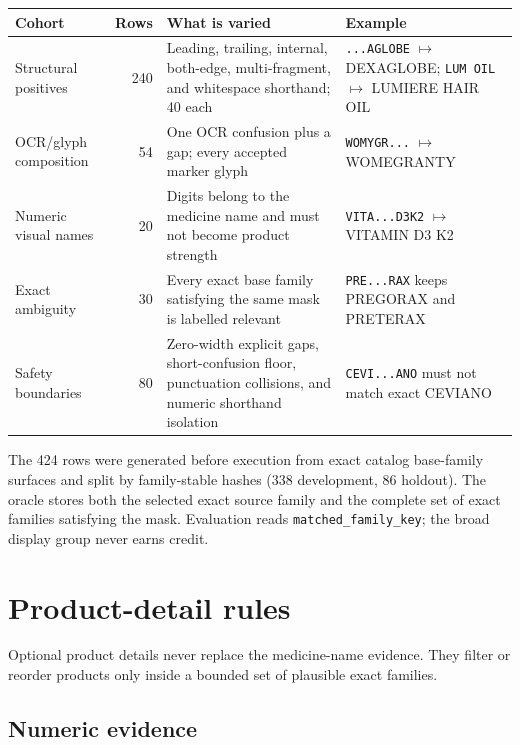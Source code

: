 \documentclass[10pt,a4paper]{article}
\newcommand{\observed}[1]{\texttt{#1}}
\begin{document}
\begin{tabularx}{\textwidth}{@{}L{39mm}r Y L{42mm}@{}}
\toprule
Cohort & Rows & What is varied & Example \\
\midrule
Structural positives & 240 & Leading, trailing, internal, both-edge, multi-fragment, and whitespace shorthand; 40 each & \observed{...AGLOBE} $\mapsto$ DEXAGLOBE; \observed{LUM OIL} $\mapsto$ LUMIERE HAIR OIL \\
OCR/glyph composition & 54 & One OCR confusion plus a gap; every accepted marker glyph & \observed{WOMYGR...} $\mapsto$ WOMEGRANTY \\
Numeric visual names & 20 & Digits belong to the medicine name and must not become product strength & \observed{VITA...D3K2} $\mapsto$ VITAMIN D3 K2 \\
Exact ambiguity & 30 & Every exact base family satisfying the same mask is labelled relevant & \observed{PRE...RAX} keeps PREGORAX and PRETERAX \\
Safety boundaries & 80 & Zero-width explicit gaps, short-confusion floor, punctuation collisions, and numeric shorthand isolation & \observed{CEVI...ANO} must not match exact CEVIANO \\
\bottomrule
\end{tabularx}

The 424 rows were generated before execution from exact catalog base-family
surfaces and split by family-stable hashes (338 development, 86 holdout).
The oracle stores both the selected exact source family and the complete set
of exact families satisfying the mask. Evaluation reads
\texttt{matched\_family\_key}; the broad display group never earns credit.

\section{Product-detail rules}

Optional product details never replace the medicine-name evidence. They filter
or reorder products only inside a bounded set of plausible exact families.

\subsection{Numeric evidence}
\end{document}
